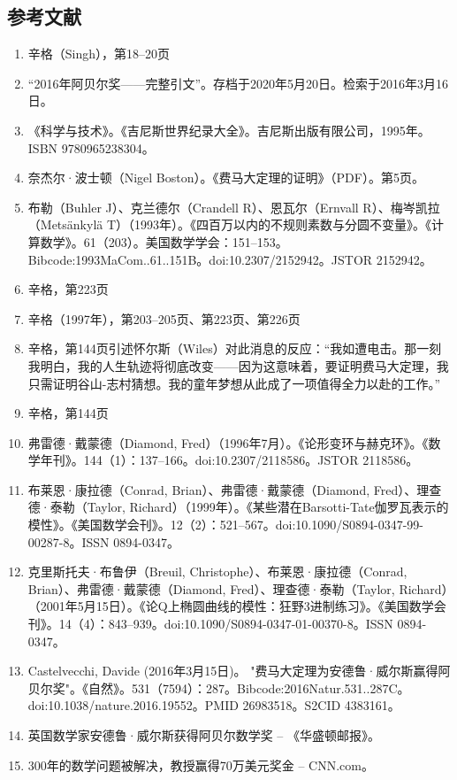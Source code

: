 \subsection{参考文献}
\begin{enumerate}
\item 辛格（Singh），第18–20页
\item “2016年阿贝尔奖——完整引文”。存档于2020年5月20日。检索于2016年3月16日。
\item 《科学与技术》。《吉尼斯世界纪录大全》。吉尼斯出版有限公司，1995年。ISBN 9780965238304。
\item 奈杰尔·波士顿（Nigel Boston）。《费马大定理的证明》（PDF）。第5页。
\item 布勒（Buhler J）、克兰德尔（Crandell R）、恩瓦尔（Ernvall R）、梅岑凯拉（Metsänkylä T）（1993年）。《四百万以内的不规则素数与分圆不变量》。《计算数学》。61（203）。美国数学学会：151–153。Bibcode:1993MaCom..61..151B。doi:10.2307/2152942。JSTOR 2152942。
\item 辛格，第223页
\item 辛格（1997年），第203–205页、第223页、第226页
\item 辛格，第144页引述怀尔斯（Wiles）对此消息的反应：“我如遭电击。那一刻我明白，我的人生轨迹将彻底改变——因为这意味着，要证明费马大定理，我只需证明谷山-志村猜想。我的童年梦想从此成了一项值得全力以赴的工作。”
\item 辛格，第144页
\item 弗雷德·戴蒙德（Diamond, Fred）（1996年7月）。《论形变环与赫克环》。《数学年刊》。144（1）：137–166。doi:10.2307/2118586。JSTOR 2118586。
\item 布莱恩·康拉德（Conrad, Brian）、弗雷德·戴蒙德（Diamond, Fred）、理查德·泰勒（Taylor, Richard）（1999年）。《某些潜在Barsotti-Tate伽罗瓦表示的模性》。《美国数学会刊》。12（2）：521–567。doi:10.1090/S0894-0347-99-00287-8。ISSN 0894-0347。
\item 克里斯托夫·布鲁伊（Breuil, Christophe）、布莱恩·康拉德（Conrad, Brian）、弗雷德·戴蒙德（Diamond, Fred）、理查德·泰勒（Taylor, Richard）（2001年5月15日）。《论Q上椭圆曲线的模性：狂野3进制练习》。《美国数学会刊》。14（4）：843–939。doi:10.1090/S0894-0347-01-00370-8。ISSN 0894-0347。
\item Castelvecchi, Davide (2016年3月15日)。 "费马大定理为安德鲁·威尔斯赢得阿贝尔奖"。《自然》。531（7594）：287。Bibcode:2016Natur.531..287C。doi:10.1038/nature.2016.19552。PMID 26983518。S2CID 4383161。  
\item 英国数学家安德鲁·威尔斯获得阿贝尔数学奖 – 《华盛顿邮报》。  
\item 300年的数学问题被解决，教授赢得70万美元奖金 – CNN.com。  

\end{enumerate}
